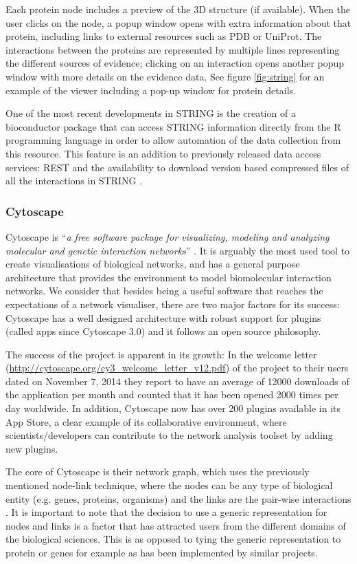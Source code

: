 Each protein node includes a preview of the 3D structure (if available). When the user clicks on the node, a popup window opens with extra information about that protein, including links to external resources such as PDB or UniProt. The interactions between the proteins are represented by multiple lines representing the different sources of evidence; clicking on an interaction opens another popup window with more details on the evidence data. See figure \ref{fig:string} for an example of the viewer including a pop-up window for protein details.

One of the most recent developments in STRING is the creation of a bioconductor package that can access STRING information directly from the R programming language in order to allow automation of the data collection from this resource. This feature is an addition to previously released  data access services: REST and the availability to download version based compressed files of all the interactions in STRING \cite{SZK2014}.

\subsubsection{Cytoscape}
Cytoscape is ``\emph{a free software package for visualizing, modeling and analyzing molecular and genetic interaction networks}'' \cite{CLI2007}. It is arguably the most used tool to create visualisations of biological networks, and has a general purpose architecture that provides the environment to model biomolecular interaction networks. We consider that besides being a useful software that reaches the expectations of a network visualiser, there are two major factors for its success: Cytoscape has a well designed architecture with robust support for plugins (called apps since Cytoscape 3.0) and it follows an open source philosophy.

The success of the project is apparent in its growth: In the welcome letter (\url{http://cytoscape.org/cy3_welcome_letter_v12.pdf}) of the project to their users dated on November 7, 2014 they report to have an average of 12000 downloads of the application per month and counted that it has been opened 2000 times per day worldwide. In addition, Cytoscape now has over 200 plugins available in its App Store, a clear example of its collaborative environment, where scientists/developers can contribute to the network analysis toolset by adding new plugins.

The core of Cytoscape is their network graph, which uses the previously mentioned node-link technique, where the nodes can be any type of biological entity (e.g. genes, proteins, organisms) and the links are the pair-wise interactions \cite{SHA2003}. It is important to note that the decision to use a generic representation for nodes and links is a factor that has attracted users from the different domains of the biological sciences. This is as opposed to tying the generic representation to protein or genes for example as has been implemented by similar projects.

